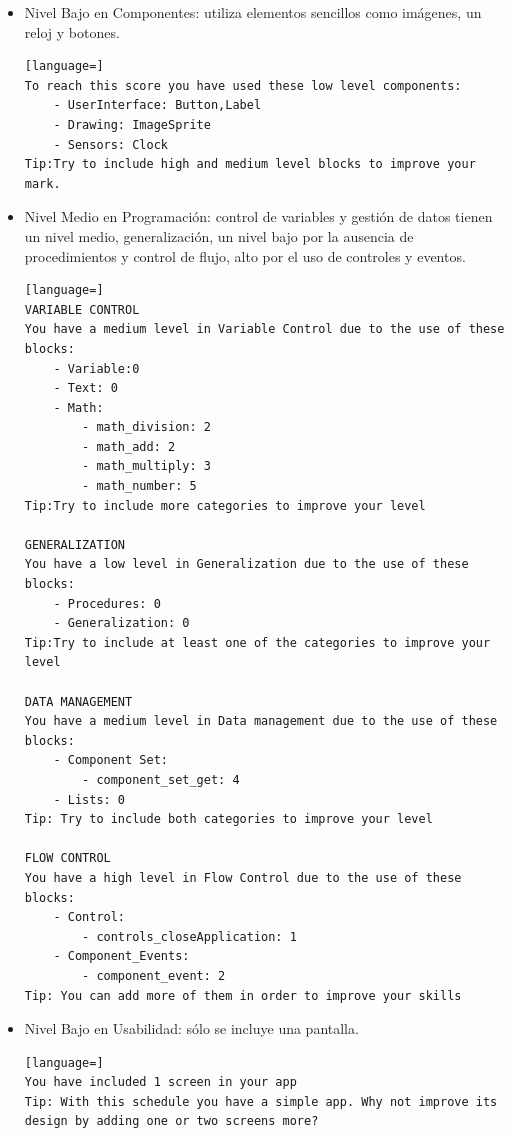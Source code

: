 \documentclass[a4paper, 12pt]{book}
\begin{document}
\begin{itemize}
  \item Nivel Bajo en Componentes: utiliza elementos sencillos como imágenes, un reloj y botones. 
\begin{lstlisting}[language=]
To reach this score you have used these low level components:
    - UserInterface: Button,Label
    - Drawing: ImageSprite
    - Sensors: Clock
Tip:Try to include high and medium level blocks to improve your mark.
\end{lstlisting}
  \item Nivel Medio en Programación: control de variables y gestión de datos tienen un nivel medio, generalización, un nivel bajo por la ausencia de procedimientos y control de flujo, alto por el uso de controles y eventos. 
\begin{lstlisting}[language=]
VARIABLE CONTROL 
You have a medium level in Variable Control due to the use of these blocks:
    - Variable:0
    - Text: 0
    - Math:
        - math_division: 2
        - math_add: 2
        - math_multiply: 3
        - math_number: 5
Tip:Try to include more categories to improve your level 

GENERALIZATION
You have a low level in Generalization due to the use of these blocks:
    - Procedures: 0
    - Generalization: 0
Tip:Try to include at least one of the categories to improve your level 

DATA MANAGEMENT
You have a medium level in Data management due to the use of these blocks:
    - Component Set:
        - component_set_get: 4
    - Lists: 0
Tip: Try to include both categories to improve your level

FLOW CONTROL
You have a high level in Flow Control due to the use of these blocks:
    - Control:
        - controls_closeApplication: 1
    - Component_Events:
        - component_event: 2
Tip: You can add more of them in order to improve your skills  
\end{lstlisting}
  \item Nivel Bajo en Usabilidad: sólo se incluye una pantalla. 
\begin{lstlisting}[language=]
You have included 1 screen in your app
Tip: With this schedule you have a simple app. Why not improve its design by adding one or two screens more? 
\end{lstlisting}
\end{itemize}

\end{document}
